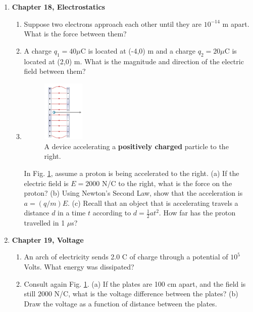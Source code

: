 \documentclass[10pt]{article}
\begin{document}
\clearpage

\begin{enumerate}
\item \textbf{Chapter 18, Electrostatics}
\begin{enumerate}
\item Suppose two electrons approach each other until they are $10^{-14}$ m apart. What is the force between them? \\ \vspace{2cm}
\item A charge $q_1 = 40 \mu$C is located at (-4,0) m and a charge $q_2 = 20 \mu$C is located at (2,0) m.  What is the magnitude and direction of the electric field between them? \\ \vspace{2cm}
\item 
\begin{figure}
\centering
\includegraphics[width=0.2\textwidth]{figures/cap.png}
\caption{\label{fig:cap} A device accelerating a \textbf{positively charged} particle to the right.}
\end{figure}
In Fig. \ref{fig:cap}, assume a proton is being accelerated to the right.  (a) If the electric field is $E = 2000$ N/C to the right, what is the force on the proton?  (b) Using Newton's Second Law, show that the acceleration is $a = (q/m) E$.  (c)  Recall that an object that is accelerating travels a distance $d$ in a time $t$ according to $d = \frac{1}{2}at^2$.  How far has the proton travelled in 1 $\mu$s? \\ \vspace{3cm}
\end{enumerate}
\item \textbf{Chapter 19, Voltage}
\begin{enumerate}
\item An arch of electricity sends 2.0 C of charge through a potential of $10^5$ Volts. What energy was dissipated? \\ \vspace{1cm}
\item Consult again Fig. \ref{fig:cap}.  (a) If the plates are 100 cm apart, and the field is still $2000$ N/C, what is the voltage difference between the plates? (b) Draw the voltage as a function of distance between the plates. \\ \vspace{3cm}

\end{enumerate}
\end{enumerate}
\end{document}
